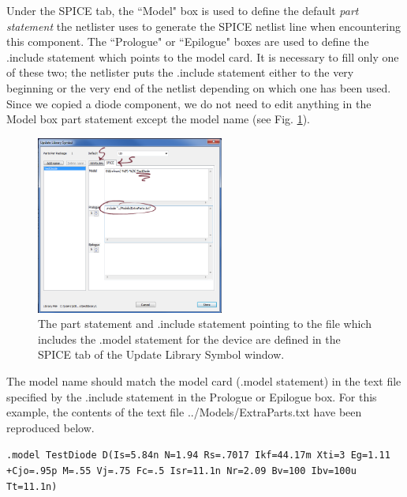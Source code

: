 Under the \textsf{SPICE} tab, the \textsf{``Model"} box is used to define the default \textit{part statement} the netlister uses to generate the SPICE netlist line when encountering this component.  The \textsf{``Prologue"} or \textsf{``Epilogue"} boxes are used to define the \textsf{.include} statement which points to the model card.  It is necessary to fill only one of these two; the netlister puts the \textsf{.include} statement either to the very beginning or the very end of the netlist depending on which one has been used.  Since we copied a diode component, we do not need to edit anything in the \textsf{Model} box part statement except the model name (see Fig. \ref{fig_schematiceditor_definingmodel}). 

\begin{figure}
  \includegraphics[width=0.55\textwidth]
	{./figures/getting_started_figures/SchematicEditor_enteringthemodel.png}
  \caption{The part statement and \textsf{.include} statement pointing to the file which includes the \textsf{.model} statement for the device are defined in the \textsf{SPICE} tab of the {\textsf{Update Library Symbol}} window.}
  \label{fig_schematiceditor_definingmodel}
\end{figure}

The model name should match the model card (\textsf{.model} statement) in the text file specified by the \textsf{.include} statement in the \textsf{Prologue} or \textsf{Epilogue} box.  For this example, the contents of the text file {\textsf{../Models/ExtraParts.txt}} have been reproduced below.
\vspace{\parskip}

\noindent\begin{minipage}{\textwidth}
\begin{center}\small{
\texttt{.model TestDiode  D(Is=5.84n N=1.94 Rs=.7017 Ikf=44.17m Xti=3 
Eg=1.11\\+Cjo=.95p M=.55 Vj=.75 Fc=.5 Isr=11.1n Nr=2.09 Bv=100 Ibv=100u Tt=11.1n)}}
\end{center}
\end{minipage}

